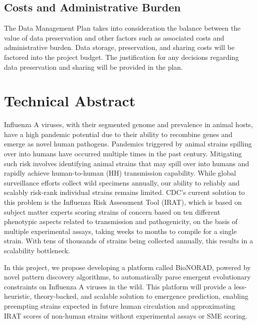 \documentclass[onecolumn, compsoc,12pt]{IEEEtran}
\begin{document}
\subsection{Costs and Administrative Burden}

The Data Management Plan takes into consideration the balance between the value of data preservation and other factors such as associated costs and administrative burden. Data storage, preservation, and sharing costs will be factored into the project budget. The justification for any decisions regarding data preservation and sharing will be provided in the plan.




\clearpage
{}

\section*{Technical Abstract}


Influenza A viruses, with their segmented genome and prevalence in animal hosts, have a high pandemic potential due to their ability to recombine genes and emerge as novel human pathogens. Pandemics triggered by animal strains spilling over into humans have occurred multiple times in the past century. Mitigating such risk involves identifying animal strains that may spill over into humans and rapidly achieve human-to-human (HH) transmission capability. While global surveillance efforts collect wild specimens annually, our ability to reliably and scalably risk-rank individual strains remains limited.
CDC's current solution to this problem is the Influenza Risk Assessment Tool (IRAT), which is based on subject matter experts scoring  strains of concern based on ten different phenotypic aspects  related to transmission and  pathogenicity, on the basis of  multiple experimental assays,  taking  weeks to months to compile for a single strain. With tens of   thousands of strains being collected annually, this results in  a scalability bottleneck.


In this project, we propose developing a platform called BioNORAD, powered by novel pattern discovery algorithms, to automatically parse emergent evolutionary constraints on Influenza A viruses in the wild. This platform will provide a less-heuristic, theory-backed, and scalable solution to emergence prediction, enabling preempting strains expected in future human circulation and approximating IRAT scores of non-human strains without experimental assays or SME scoring.
\end{document}
